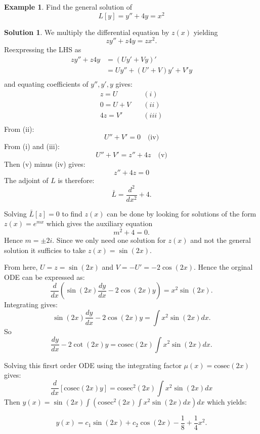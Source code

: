 \documentclass{article}
\theoremstyle{plain}
\theoremstyle{definition}
\newtheorem{exmp}{Example}[section]
\newtheorem*{sol}{Solution}
\numberwithin{equation}{section}
\begin{document}
\begin{tcolorbox}
    \begin{exmp}
        Find the general solution of
        \[ L[y]= y'' + 4y = x^2 \]
    \end{exmp}
    \begin{sol}
        We multiply the differential equation by $z(x)$ yielding
        \[ zy'' + z4y = zx^2. \]
        Reexpressing the LHS as
        \begin{align*}
            zy'' + z4y &= (Uy' + Vy)' \\
            &= Uy'' + (U'+V)y' + V'y \\
        \end{align*}
        and equating coefficients of $y'',y',y$ gives:
        \[ \begin{matrix}
            z=U & \quad (i) \\
            0 = U + V & \quad (ii) \\
            4z = V' & \quad (iii) \\
        \end{matrix}
        \]
        From (ii): 
        \[U''+V'=0 \quad \text{(iv)} \]
        From (i) and (iii):
        \[ U''+V' = z'' + 4z \quad \text{(v)} \]
        Then (v) minus (iv) gives:
        \[ z'' + 4z = 0 \]
        The adjoint of $L$ is therefore:
        \[ \bar{L} = \frac{d^2}{dx^2} + 4. \]

        Solving $\bar{L}[z] = 0$ to find $z(x)$ can be done by looking for solutions of the form $z(x) = e^{mx}$ which gives the auxiliary equation
        \[ m^2 + 4 = 0. \]
        Hence $m = \pm 2i$. Since we only need one solution for $z(x)$ and not the general solution it sufficies to take $z(x)=\sin(2x)$.
        
    \end{sol}
\end{tcolorbox}
\begin{tcolorbox}
    

        From here, $U=z=\sin(2x)$ and $V=-U'=-2\cos(2x)$. Hence the orginal ODE can be expressed as:
        \[ \frac{d}{dx}\left( \sin(2x)\frac{dy}{dx} -2\cos(2x)y \right) = x^2\sin(2x). \]
        Integrating gives:
        \[ \sin(2x)\frac{dy}{dx} - 2\cos(2x)y = \int x^2 \sin (2x) dx.\]
        So
        \[ \frac{dy}{dx} - 2\cot(2x)y = \text{cosec}(2x) \int x^2 \sin(2x)dx.\]
        
        Solving this firsrt order ODE using the integrating factor $\mu(x) = \text{cosec}(2x)$ gives:
        \[ \frac{d}{dx} \left[ \text{cosec}(2x)y \right] = \text{cosec}^2(2x) \int x^2 \sin(2x) dx \]
        Then $y(x) = \sin(2x) \int \left( \text{cosec}^2(2x)\int x^2 \sin(2x) dx \right) dx$ which yields:

        \[ y(x) = c_1 \sin(2x) + c_2 \cos(2x) - \frac{1}{8} + \frac{1}{4}x^2. \]
\end{tcolorbox}
\end{document}
